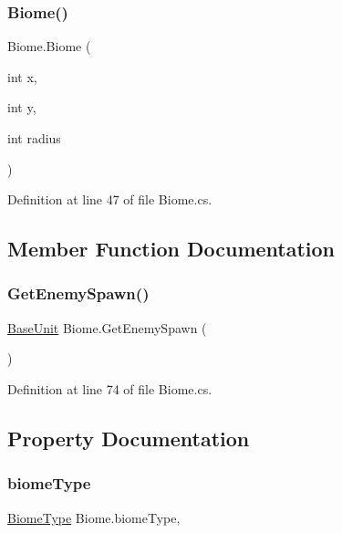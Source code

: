 \subsubsection{\texorpdfstring{Biome()}{Biome()}}
{\footnotesize\ttfamily Biome.\+Biome (\begin{DoxyParamCaption}\item[{int}]{x,  }\item[{int}]{y,  }\item[{int}]{radius }\end{DoxyParamCaption})}



Definition at line 47 of file Biome.\+cs.



\subsection{Member Function Documentation}
\mbox{\label{class_biome_abfb2b6d9c6ae23d0d7f247e10b568a9e}} 
\subsubsection{\texorpdfstring{GetEnemySpawn()}{GetEnemySpawn()}}
{\footnotesize\ttfamily \mbox{\hyperlink{class_base_unit}{Base\+Unit}} Biome.\+Get\+Enemy\+Spawn (\begin{DoxyParamCaption}{ }\end{DoxyParamCaption})}



Definition at line 74 of file Biome.\+cs.



\subsection{Property Documentation}
\mbox{\label{class_biome_a0b8fc33054a627c978fa9d81573a9e1d}} 
\subsubsection{\texorpdfstring{biomeType}{biomeType}}
{\footnotesize\ttfamily \mbox{\hyperlink{class_biome_a7ddcfcc6d4e88c5eb73df6827df862da}{Biome\+Type}} Biome.\+biome\+Type\hspace{0.3cm}{\ttfamily [get]}, {\ttfamily [set]}}



